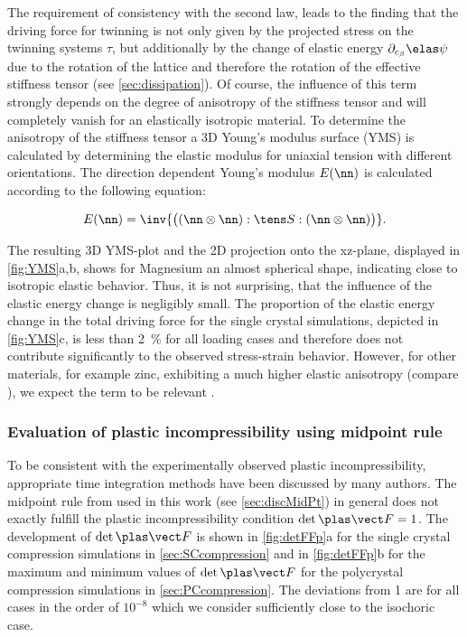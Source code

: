   The requirement of consistency with the second law, leads to the finding that the driving force for twinning is not only given by the projected stress on the twinning systems $\tau$, but additionally by the change of elastic energy $\partial_{\cb}\psie$ due to the rotation of the lattice and therefore the rotation of the effective stiffness tensor (see \cref{sec:dissipation}). Of course, the influence of this term strongly depends on the degree of anisotropy of the stiffness tensor and will completely vanish for an elastically isotropic material. To determine the anisotropy of the stiffness tensor a 3D Young's modulus surface (YMS) is calculated by determining the elastic modulus for uniaxial tension with different orientations. The direction dependent Young's modulus $E(\nn)$ is calculated according to the following equation: 
  
  \begin{align}
    E(\nn) = \inv{\big((\nn \otimes \nn) : \SSSS : (\nn \otimes \nn)\big)}.
  \end{align}
  
  The resulting 3D YMS-plot and the 2D projection onto the xz-plane, displayed in \cref{fig:YMS}a,b, shows for Magnesium an almost spherical shape, indicating close to isotropic elastic behavior. Thus, it is not surprising, that the influence of the elastic energy change is negligibly small. The proportion of the elastic energy change in the total driving force for the single crystal simulations, depicted in \cref{fig:YMS}c, is less than 2~\% for all loading cases and therefore does not contribute significantly to the observed stress-strain behavior. However, for other materials, for example zinc, exhibiting a much higher elastic anisotropy (compare ), we expect the term to be relevant . 
  
  
  \subsubsection{Evaluation of plastic incompressibility using midpoint rule}\label{sec:EvalIsoPlas} %
  
  To be consistent with the experimentally observed plastic incompressibility, appropriate time integration methods have been discussed by many authors\supercite{dafaliasPlasticSpinNecessity1998,ortizVariationalFormulationViscoplastic1999,motaLiegroupInterpolationVariational2013}. The midpoint rule from  used in this work (see \cref{sec:discMidPt}) in general does not exactly fulfill the plastic incompressibility condition \mbox{$\det{\FFp}=1$}. The development of $\det{\FFp}$ is shown in \cref{fig:detFFp}a for the single crystal compression simulations in \cref{sec:SCcompression} and in \cref{fig:detFFp}b for the maximum and minimum values of $\det{\FFp}$ for the polycrystal compression simulations in \cref{sec:PCcompression}. The deviations from 1 are for all cases in the order of $10^{-8}$ which we consider sufficiently close to the isochoric case. 
  
